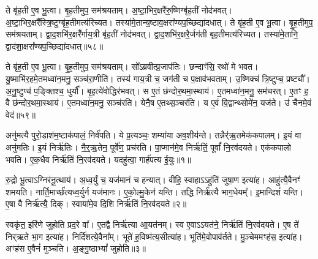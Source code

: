 ते बृ॑ह॒ती ए॒व भू॒त्वा।
बृ॒ह॒तीमुप॒ सम॑श्रयताम्।
अ॒ष्टा॒भि\-र॒क्षरै॑रु॒ष्णिग्बृ॑ह॒तीं नोद॑भवत्।
अ॒ष्टा॒भि\-र॒क्षरै᳚स्त्रि॒ष्टुग्बृ॑ह॒ती\-मत्य॑\-रिच्यत।
तस्या॑मे॒तान्य॒ष्टाव॒क्षरा᳚ण्यप॒च्छिद्या॑\-दधात्।
ते बृ॑ह॒ती ए॒व भू॒त्वा।
बृ॒ह॒तीमुप॒ सम॑श्रयताम्।
द्वा॒द॒शभि॑र॒क्षरै᳚र्गाय॒त्री बृ॑ह॒तीं नोद॑भवत्।
द्वा॒द॒शभि॑र॒क्षरै॒र्जग॑ती बृह॒तीमत्य॑रिच्यत।
तस्या॑मे॒तानि॒ द्वाद॑शा॒क्षरा᳚ण्यप॒च्छिद्या॑\-दधात्॥५८॥\ip

ते बृ॑ह॒ती ए॒व भू॒त्वा।
बृ॒ह॒तीमुप॒ सम॑श्रयताम्।
सो᳚ऽब्रवीत्प्र॒जा\-प॑तिः।
छन्दाꣳ॑सि॒ रथो॑ मे भवत।
यु॒ष्माभि॑र॒हमे॒तमध्वा॑न॒मनु॒ सञ्च॑रा॒णीति॑।
तस्य॑ गाय॒त्री च॒ जग॑ती च प॒क्षाव॑भवताम्।
उ॒ष्णिक्च॑ त्रि॒ष्टुप्च॒ प्रष्ट्यौ᳚।
अ॒नु॒ष्टुप्च॑ प॒ङ्क्तिश्च॒ धुर्यौ᳚।
बृ॒ह॒त्ये॑वोद्धिर॑भवत्।
स ए॒तं छ॑न्दोर॒थमा॒स्थाय॑।
ए॒तमध्वा॑न॒मनु॒ सम॑चरत्।
ए॒तꣳ ह॒ वै छ॑न्दोर॒थमा॒स्थाय॑।
ए॒तमध्वा॑न॒मनु॒ सञ्च॑रति।
येनै॒ष ए॒तथ्स॒ञ्चर॑ति।
य ए॒वं वि॒द्वान्थ्सोमे॑न॒ यज॑ते। उ॑ चैनमे॒वं वेद॑॥५९॥\ip\anuvakamend[अ॒भ॒व॒न्वाव सा दे॒वाक्ष॑रा बृह॒त्य॑दधा॒द्द्वाद॑शा॒क्षरा᳚ण्यप॒च्छिद्या॑दधादा॒स्थाय॒ षट्च॑]


\clearpage
{}
\setcounter{anuvakam}{0}

अनु॑मत्यै पुरो॒डाश॑म॒ष्टा\-क॑पालं॒ निर्व॑पति।
ये प्र॒त्यञ्चः॒ शम्या॑या अव॒शीय॑न्ते।
तन्नैर्॑ऋ॒तमेक॑कपालम्।
इ॒यं वा अनु॑मतिः।
इ॒यं निर्\mbox{}ऋ॑तिः।
नै॒र्॒ऋ॒तेन॒ पूर्वे॑ण॒ प्रच॑रति।
पा॒प्मान॑मे॒व निर्\mbox{}ऋ॑तिं॒ पूर्वां᳚ नि॒रव॑दयते।
एक॑कपालो भवति।
ए॒क॒धैव निर्\mbox{}ऋ॑तिं नि॒रव॑दयते।
यदहु॑त्वा॒ गार्\mbox{}ह॑पत्य ई॒युः॥१॥\ip

रु॒द्रो भू॒त्वा\-ऽग्निर॑नू॒त्थाय॑।
अ॒ध्व॒र्युं च॒ यज॑मानं च हन्यात्।
वीहि॒ स्वाहा\-ऽऽहु॑तिं जुषा॒ण इत्या॑ह।
आहु॑त्यै॒वैनꣳ॑ शमयति।
नार्ति॒मार्च्छ॑त्यध्व॒र्युर्न यज॑मानः।
ए॒को॒ल्मु॒केन॑ यन्ति।
तद्धि निर्\mbox{}ऋ॑त्यै भाग॒धेयम्᳚।
इ॒मान्दिशं॑ यन्ति।
ए॒षा वै निर्\mbox{}ऋ॑त्यै॒ दिक्।
स्वाया॑मे॒व दि॒शि निर्\mbox{}ऋ॑तिं नि॒रव॑दयते॥२॥\ip

स्वकृ॑त॒ इरि॑णे जुहोति प्रद॒रे वा᳚।
ए॒तद्वै निर्\mbox{}ऋ॑त्या आ॒यत॑नम्।
स्व ए॒वाऽऽयत॑ने॒ निर्\mbox{}ऋ॑तिं नि॒रव॑दयते।
ए॒ष ते॑ निर्‌\mbox{}ऋते भा॒ग इत्या॑ह।
निर्दि॑शत्ये॒वैना᳚म्।
भूते॑ ह॒विष्म॑त्य॒सीत्या॑ह।
भूति॑मे॒वोपाव॑र्तते।
मु॒ञ्चेममꣳह॑स॒ इत्या॑ह।
अꣳह॑स ए॒वैनं॑ मुञ्चति।
अ॒ङ्गु॒ष्ठाभ्यां᳚ जुहोति॥३॥\ip

